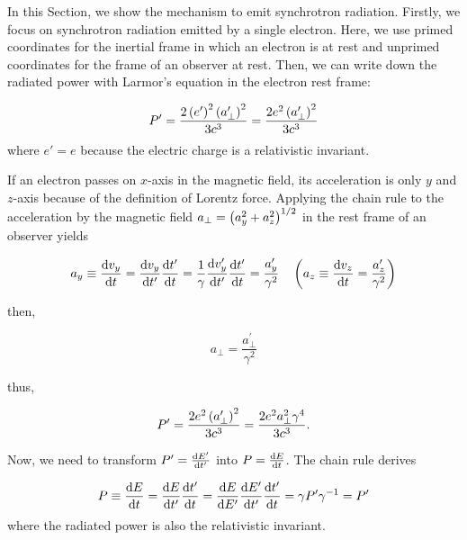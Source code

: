 In this Section, we show the mechanism to emit synchrotron radiation.
Firstly, we focus on synchrotron radiation emitted by a single electron.
Here, we use primed coordinates for the inertial frame in which an electron is at rest and unprimed coordinates for the frame of an observer at rest.
Then, we can write down the radiated power with Larmor's equation in the electron rest frame:

\begin{equation}\label{eq:essential_radio5n24}
    P^{\prime}=\frac{2\left(e^{\prime}\right)^{2}\left(a_{\perp}^{\prime}\right)^{2}}{3 c^{3}}=\frac{2 e^{2}\left(a_{\perp}^{\prime}\right)^{2}}{3 c^{3}}
\end{equation}
where $e'=e$ because the electric charge is a relativistic invariant.

If an electron passes on $x$-axis in the magnetic field, its acceleration is only $y$ and $z$-axis because of the definition of Lorentz force.
Applying the chain rule to the acceleration by the magnetic field $a_{\perp} = \left(a^2_y + a^2_z\right)^{1/2}$ in the rest frame of an observer yields

\begin{equation}\label{eq:essential_radio5n25}
    a_y \equiv \frac{\mathrm{d} v_y}{\mathrm{d} t}=\frac{\mathrm{d} v_y}{\mathrm{d} t^{\prime}} \frac{\mathrm{d} t^{\prime}}{\mathrm{d} t}=\frac{1}{\gamma} \frac{\mathrm{d} v_y^{\prime}}{\mathrm{d} t^{\prime}} \frac{\mathrm{d} t^{\prime}}{\mathrm{d} t}=\frac{a_y^{\prime}}{\gamma^2}\ \ \ \left(a_z \equiv \frac{\mathrm{d} v_z}{\mathrm{d} t} = \frac{a'_z}{\gamma^2}\right)
\end{equation}

then,

\begin{equation}\label{eq:essential_radio5n26}
    a_{\perp}=\frac{a_{\perp}^{\prime}}{\gamma^{2}}
\end{equation}

thus,

\begin{equation}\label{eq:essential_radio5n27}
    P^{\prime}=\frac{2 e^{2}\left(a_{\perp}^{\prime}\right)^{2}}{3 c^{3}}=\frac{2 e^{2} a_{\perp}^{2} \gamma^{4}}{3 c^{3}}.
\end{equation}

Now, we need to transform $P' = \frac{\mathrm{d} E'}{\mathrm{d} t'}$ into $P = \frac{\mathrm{d} E}{\mathrm{d} t}$.
The chain rule derives

\begin{equation}\label{eq:essential_radio5n28}
    P \equiv \frac{\mathrm{d} E}{\mathrm{d} t}=\frac{\mathrm{d} E}{\mathrm{d} t^{\prime}} \frac{\mathrm{d} t^{\prime}}{\mathrm{d} t}=\frac{\mathrm{d} E}{\mathrm{d} E^{\prime}} \frac{\mathrm{d} E^{\prime}}{\mathrm{d} t^{\prime}} \frac{\mathrm{d} t^{\prime}}{\mathrm{d} t}=\gamma P^{\prime} \gamma^{-1}=P^{\prime}
\end{equation}
where the radiated power is also the relativistic invariant.

